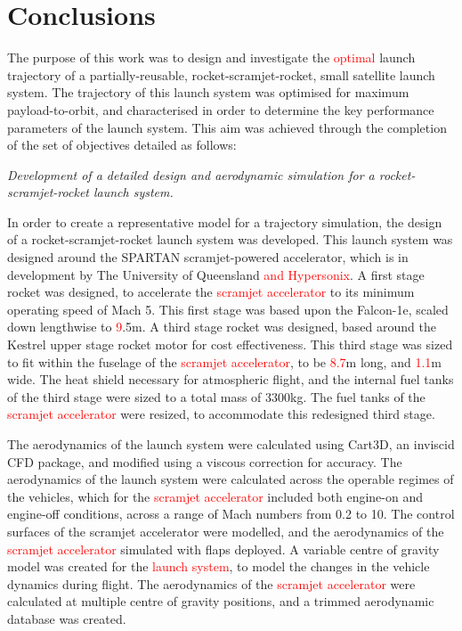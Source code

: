 
\cleardoublepage
\chapter{Conclusions}

The purpose of this work was to design and investigate the \textcolor{red}{optimal} launch trajectory of a partially-reusable, rocket-scramjet-rocket, small satellite launch system. 
The trajectory of this launch system was optimised for maximum payload-to-orbit, and characterised in order to determine the key performance parameters of the launch system. 
This aim was achieved through the completion of the set of objectives detailed as follows:

\vspace{10pt}
	\emph{Development of a detailed design and aerodynamic simulation for a rocket-scramjet-rocket launch system.}
	
	In order to create a representative model for a trajectory simulation, the design of a rocket-scramjet-rocket launch system was developed. This launch system was designed around the SPARTAN scramjet-powered accelerator, which is in development by The University of Queensland \textcolor{red}{and Hypersonix}. A first stage rocket was designed, to accelerate the \textcolor{red}{scramjet accelerator} to its minimum operating speed of Mach 5. This first stage was based upon the Falcon-1e, scaled down lengthwise to \textcolor{red}{9}.5m.
	A third stage rocket was designed, based around the Kestrel upper stage rocket motor for cost effectiveness. This third stage was sized to fit within the fuselage of the \textcolor{red}{scramjet accelerator}, to be \textcolor{red}{8.7}m long, and \textcolor{red}{1.1}m wide. The heat shield necessary for atmospheric flight, and the internal fuel tanks of the third stage were sized to a total mass of 3300kg. The fuel tanks of the \textcolor{red}{scramjet accelerator} were resized, to accommodate this redesigned third stage. 

The aerodynamics of the launch system were calculated using Cart3D, an inviscid CFD package, and modified using a viscous correction for accuracy. The aerodynamics of the launch system were calculated across the operable regimes of the vehicles, which for the \textcolor{red}{scramjet accelerator} included both engine-on and engine-off conditions, across a range of Mach numbers from 0.2 to 10. The control surfaces of the scramjet accelerator were modelled, and the aerodynamics of the \textcolor{red}{scramjet accelerator} simulated with flaps deployed. A variable centre of gravity model was created for the \textcolor{red}{launch system}, to model the changes in the vehicle dynamics during flight. The aerodynamics of the \textcolor{red}{scramjet accelerator} were calculated at multiple centre of gravity positions, and a trimmed aerodynamic database was created. 

